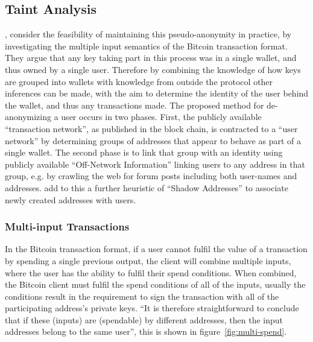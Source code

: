 \subsection{Taint Analysis}
\textcite{reid-anon}, consider the feasibility of maintaining this pseudo-anonymity in practice, by investigating the multiple input semantics of the Bitcoin transaction format. They argue that any key taking part in this process was in a single wallet, and thus owned by a single user. Therefore by combining the knowledge of how keys are grouped into wallets with knowledge from outside the protocol other inferences can be made, with the aim to determine the identity of the user behind the wallet, and thus any transactions made.  The proposed method for de-anonymizing a user occurs in two phases.  First, the publicly available ``transaction network'', as published in the block chain, is contracted to a ``user network'' by determining groups of addresses that appear to behave as part of a single wallet.  The second phase is to link that group with an identity using publicly available ``Off-Network Information'' linking users to any address in that group, e.g. by crawling the web for forum posts including both user-names and addresses.  \textcite{eval-priv} add to this a further heuristic of ``Shadow Addresses'' to associate newly created addresses with users.

\subsubsection{Multi-input Transactions}
In the Bitcoin transaction format, if a user cannot fulfil the value of a transaction by spending a single previous output, the client will combine multiple inputs, where the user has the ability to fulfil their spend conditions.  When combined, the Bitcoin client must fulfil the spend conditions of all of the inputs, usually the conditions result in the requirement to sign the transaction with all of the participating address's private keys.  ``It is therefore straightforward to conclude that if these (inputs) are (spendable) by different addresses, then the input addresses belong to the same user''\cite{eval-priv}, this is shown in figure~\ref{fig:multi-spend}.

